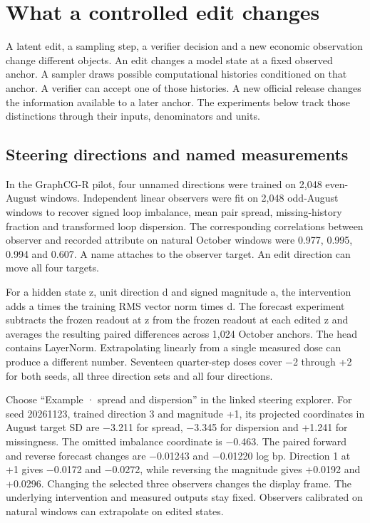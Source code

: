 \documentclass[11pt,oneside,openany]{book}
\begin{document}
\chapter{What a controlled edit changes}
A latent edit, a sampling step, a verifier decision and a new economic observation change different objects. An edit changes a model state at a fixed observed anchor. A sampler draws possible computational histories conditioned on that anchor. A verifier can accept one of those histories. A new official release changes the information available to a later anchor. The experiments below track those distinctions through their inputs, denominators and units.

\section*{Steering directions and named measurements}
In the GraphCG-R pilot, four unnamed directions were trained on 2,048 even-August windows. Independent linear observers were fit on 2,048 odd-August windows to recover signed loop imbalance, mean pair spread, missing-history fraction and transformed loop dispersion. The corresponding correlations between observer and recorded attribute on natural October windows were 0.977, 0.995, 0.994 and 0.607. A name attaches to the observer target. An edit direction can move all four targets.

For a hidden state z, unit direction d and signed magnitude a, the intervention adds a times the training RMS vector norm times d. The forecast experiment subtracts the frozen readout at z from the frozen readout at each edited z and averages the resulting paired differences across 1,024 October anchors. The head contains LayerNorm. Extrapolating linearly from a single measured dose can produce a different number. Seventeen quarter-step doses cover \ensuremath{-}2 through +2 for both seeds, all three direction sets and all four directions.

Choose “Example · spread and dispersion” in the linked steering explorer. For seed 20261123, trained direction 3 and magnitude +1, its projected coordinates in August target SD are \ensuremath{-}3.211 for spread, \ensuremath{-}3.345 for dispersion and +1.241 for missingness. The omitted imbalance coordinate is \ensuremath{-}0.463. The paired forward and reverse forecast changes are \ensuremath{-}0.01243 and \ensuremath{-}0.01220 log bp. Direction 1 at +1 gives \ensuremath{-}0.0172 and \ensuremath{-}0.0272, while reversing the magnitude gives +0.0192 and +0.0296. Changing the selected three observers changes the display frame. The underlying intervention and measured outputs stay fixed. Observers calibrated on natural windows can extrapolate on edited states.
\end{document}
